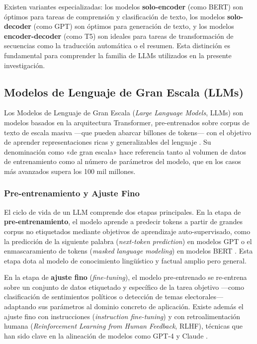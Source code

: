 \documentclass[listof=nochaptergap,12pt,times,authoryear]{report}
\begin{document}
Existen variantes especializadas: los modelos \textbf{solo-encoder} (como BERT) son óptimos para tareas de comprensión y clasificación de texto, los modelos \textbf{solo-decoder} (como GPT) son óptimos para generación de texto, y los modelos \textbf{encoder-decoder} (como T5) son ideales para tareas de transformación de secuencias como la traducción automática o el resumen. Esta distinción es fundamental para comprender la familia de LLMs utilizados en la presente investigación.
 
\subsection{Modelos de Lenguaje de Gran Escala (LLMs)}
 
Los Modelos de Lenguaje de Gran Escala (\textit{Large Language Models}, LLMs) son modelos basados en la arquitectura Transformer, pre-entrenados sobre corpus de texto de escala masiva —que pueden abarcar billones de tokens— con el objetivo de aprender representaciones ricas y generalizables del lenguaje \parencite{bk_russell2009intart}. Su denominación como «de gran escala» hace referencia tanto al volumen de datos de entrenamiento como al número de parámetros del modelo, que en los casos más avanzados supera los 100 mil millones.
 
\subsubsection{Pre-entrenamiento y Ajuste Fino}
 
El ciclo de vida de un LLM comprende dos etapas principales. En la etapa de \textbf{pre-entrenamiento}, el modelo aprende a predecir tokens a partir de grandes corpus no etiquetados mediante objetivos de aprendizaje auto-supervisado, como la predicción de la siguiente palabra (\textit{next-token prediction}) en modelos GPT o el enmascaramiento de tokens (\textit{masked language modeling}) en modelos BERT \parencite{tec_devlin2018bert}. Esta etapa dota al modelo de conocimiento lingüístico y factual amplio pero general.
 
En la etapa de \textbf{ajuste fino} (\textit{fine-tuning}), el modelo pre-entrenado se re-entrena sobre un conjunto de datos etiquetado y específico de la tarea objetivo —como clasificación de sentimientos políticos o detección de temas electorales— adaptando sus parámetros al dominio concreto de aplicación. Existe además el ajuste fino con instrucciones (\textit{instruction fine-tuning}) y con retroalimentación humana (\textit{Reinforcement Learning from Human Feedback}, RLHF), técnicas que han sido clave en la alineación de modelos como GPT-4 y Claude \parencite{tec_ouyang2022instructgpt}.
 
\end{document}
